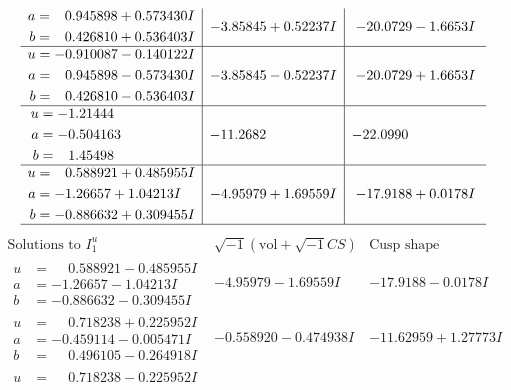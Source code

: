 \documentclass[1p]{elsarticle_modified}
\theoremstyle{definition}
\newcommand{\I}{\sqrt{-1}}
\begin{document}
$$\begin{array}{c|c|c}
\begin{aligned}
a &= \phantom{-}0.945898 + 0.573430 I \\
b &= \phantom{-}0.426810 + 0.536403 I\end{aligned}
 & -3.85845 + 0.52237 I & -20.0729 - 1.6653 I \\ \hline\begin{aligned}
u &= -0.910087 - 0.140122 I \\
a &= \phantom{-}0.945898 - 0.573430 I \\
b &= \phantom{-}0.426810 - 0.536403 I\end{aligned}
 & -3.85845 - 0.52237 I & -20.0729 + 1.6653 I \\ \hline\begin{aligned}
u &= -1.21444\phantom{ +0.000000I} \\
a &= -0.504163\phantom{ +0.000000I} \\
b &= \phantom{-}1.45498\phantom{ +0.000000I}\end{aligned}
 & -11.2682\phantom{ +0.000000I} & -22.0990\phantom{ +0.000000I} \\ \hline\begin{aligned}
u &= \phantom{-}0.588921 + 0.485955 I \\
a &= -1.26657 + 1.04213 I \\
b &= -0.886632 + 0.309455 I\end{aligned}
 & -4.95979 + 1.69559 I & -17.9188 + 0.0178 I\\
 \hline 
 \end{array}$$\newpage$$\begin{array}{c|c|c}  
\text{Solutions to }I^u_{1}& \I (\text{vol} + \sqrt{-1}CS) & \text{Cusp shape}\\
 \hline 
\begin{aligned}
u &= \phantom{-}0.588921 - 0.485955 I \\
a &= -1.26657 - 1.04213 I \\
b &= -0.886632 - 0.309455 I\end{aligned}
 & -4.95979 - 1.69559 I & -17.9188 - 0.0178 I \\ \hline\begin{aligned}
u &= \phantom{-}0.718238 + 0.225952 I \\
a &= -0.459114 - 0.005471 I \\
b &= \phantom{-}0.496105 - 0.264918 I\end{aligned}
 & -0.558920 - 0.474938 I & -11.62959 + 1.27773 I \\ \hline\begin{aligned}
u &= \phantom{-}0.718238 - 0.225952 I \\

\end{aligned}
\end{array}$$
\end{document}
